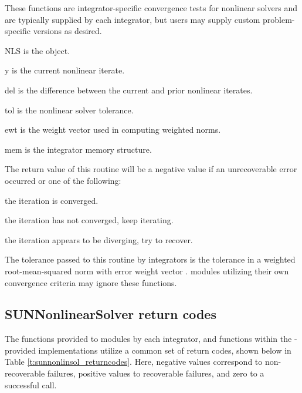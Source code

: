 {
  These functions are {\sundials} integrator-specific convergence tests for
  nonlinear solvers and are typically supplied by each {\sundials} integrator,
  but users may supply custom problem-specific versions as desired.
}
{
  \begin{args}[NLS]
  \item[NLS]
    is the {\sunnonlinsol} object.
  \item[y]
    is the current nonlinear iterate.
  \item[del]
    is the difference between the current and prior nonlinear iterates.
  \item[tol]
    is the nonlinear solver tolerance.
  \item[ewt]
    is the weight vector used in computing weighted norms.
  \item[mem]
    is the {\sundials} integrator memory structure.
  \end{args}
}
{
  The return value of this routine will be a negative value if an unrecoverable
  error occurred or one of the following:
  \begin{args}
  \item[\id{SUN\_NLS\_SUCCESS}]
    the iteration is converged.
  \item[\id{SUN\_NLS\_CONTINUE}]
    the iteration has not converged, keep iterating.
  \item[\id{SUN\_NLS\_CONV\_RECVR}]
    the iteration appears to be diverging, try to recover.
  \end{args}
}
{
  The tolerance passed to this routine by {\sundials} integrators is the
  tolerance in a weighted root-mean-squared norm with error weight
  vector . {\sunnonlinsol} modules utilizing their own convergence
  criteria may ignore these functions.
}


\subsection{SUNNonlinearSolver return codes}
\label{ss:sunnonlinsol_returncodes}

The functions provided to {\sunnonlinsol} modules by each {\sundials}
integrator, and functions within the {\sundials}-provided {\sunnonlinsol}
implementations utilize a common set of return codes, shown below in
Table \ref{t:sunnonlinsol_returncodes}.  Here, negative values
correspond to non-recoverable failures, positive values to recoverable
failures, and zero to a successful call.

